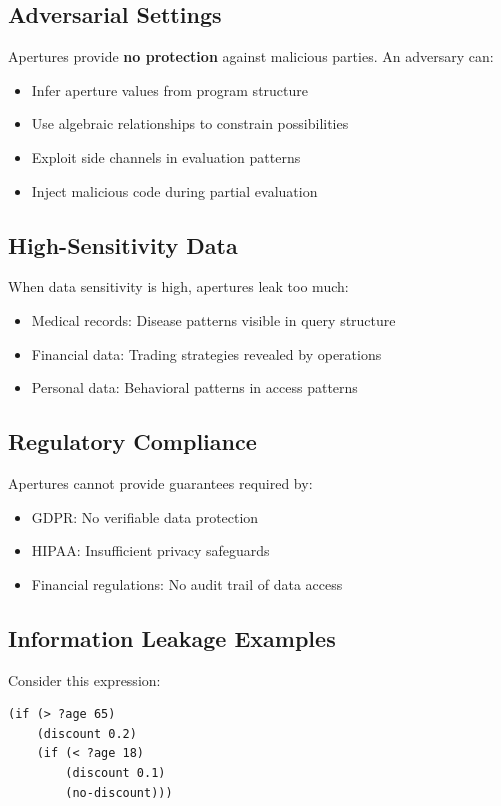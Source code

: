 \documentclass[10pt]{article}
\begin{document}
\subsection{Adversarial Settings}
Apertures provide \textbf{no protection} against malicious parties. An adversary can:
\begin{itemize}
\item Infer aperture values from program structure
\item Use algebraic relationships to constrain possibilities
\item Exploit side channels in evaluation patterns
\item Inject malicious code during partial evaluation
\end{itemize}

\subsection{High-Sensitivity Data}
When data sensitivity is high, apertures leak too much:
\begin{itemize}
\item Medical records: Disease patterns visible in query structure
\item Financial data: Trading strategies revealed by operations
\item Personal data: Behavioral patterns in access patterns
\end{itemize}

\subsection{Regulatory Compliance}
Apertures cannot provide guarantees required by:
\begin{itemize}
\item GDPR: No verifiable data protection
\item HIPAA: Insufficient privacy safeguards
\item Financial regulations: No audit trail of data access
\end{itemize}

\subsection{Information Leakage Examples}

Consider this expression:
\begin{lstlisting}
(if (> ?age 65)
    (discount 0.2)
    (if (< ?age 18)
        (discount 0.1)
        (no-discount)))
\end{lstlisting}
\end{document}

